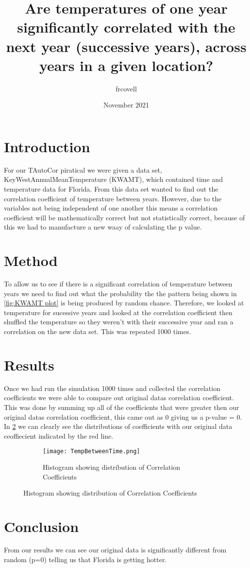 \documentclass{article}
\title{Are temperatures of one year significantly correlated with the next year (successive years), across years in a given location?}
\author{frcovell }
\date{November 2021}
\begin{document}
\maketitle

\section{Introduction}
For our TAutoCor piratical we were given a data set, KeyWestAnnualMeanTemperature (KWAMT), which contained time and temperature data for Florida. From this data set wanted to find out the correlation coefficient of temperature between years. However, due to the variables not being independent of one another this means a correlation coefficient will be mathematically correct but not statistically correct, because of this we  had to manufacture a new waay of calculating the p value.

\section{Method}
To allow us to see if there is a significant correlation of temperature between years we need to find out what the probability the the pattern being shown in \ref{fig:KWAMT plot} is being produced by random chance. Therefore, we looked at temperature for sucessive years and looked at the correlation coefficient then shuffled the temperature so they weren't with their successive year and ran a correlation on the new data set. This was repeated 1000 times.

\section{Results}
Once we had run the simulation 1000 times and collected the correlation coefficients we were able to compare out original datas correlation coefficient. This was done by summing up all of the coefficients that were greater then our original datas correlation coefficient, this came out as 0 giving us a p-value = 0. In \ref{fig:Coefficient histogram} we can clearly see the distributions of coefficients with our original data ceoffiecient indicated by the red line.
\begin{figure}[htp]
    \centering 
    \begin{subfigure}[b]{0.3\textwidth}
    \texttt{[image: TempBetweenTime.png]}
    \caption{Histogram showing distribution of Correlation Coefficients}
    \label{fig:Coefficient histogram}
    \end{subfigure}
\end{figure}

\section{Conclusion}
From our results we can see our original data is significantly different from random (p=0) telling us that Florida is getting hotter.
\end{document}
